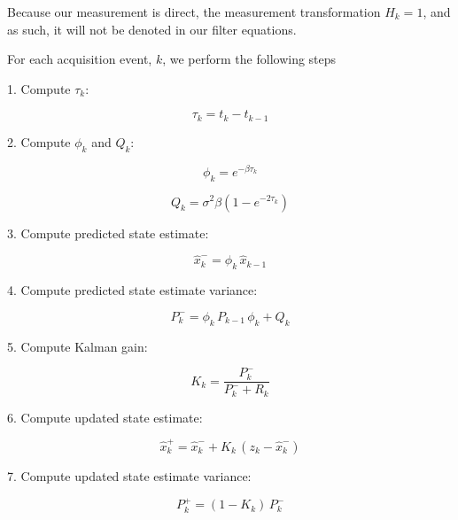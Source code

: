 \documentclass[12pt]{article}
\begin{document}
Because our measurement is direct, the measurement transformation $H_k = 1$, and as such,
it will not be denoted in our filter equations.

For each acquisition event, $k$, we perform the following steps

1. Compute $\tau_k$:

\begin{equation}
    \tau_k = t_k - t_{k-1}
    \label{eq:KF-tau}
\end{equation}

2. Compute $\phi_k$ and $Q_k$:

\begin{equation}
   \phi_k = e^{-\beta \tau_k}
   \label{eq:KF-phi}
\end{equation}

\begin{equation}
  Q_k = \sigma^2 \beta \left ( 1 - e^{-2 \tau_k} \right )
  \label{eq:KF-Q}
\end{equation}

3. Compute predicted state estimate:

\begin{equation}
    \hat{x}_k^- = \phi_k \, \hat{x}_{k-1}
    \label{eq:KF-x-prediction}
\end{equation}

4. Compute predicted state estimate variance:

\begin{equation}
    P_k^- = \phi_k \, P_{k-1} \, \phi_k + Q_k
    \label{eq:KF-P-prediction}
\end{equation}

5. Compute Kalman gain:

\begin{equation}
    K_k = \frac{P_k^-}{P_k^- + R_k}
    \label{eq:KF-gain}
\end{equation}

6. Compute updated state estimate:

\begin{equation}
    \hat{x}_k^+ = \hat{x}_k^- + K_k \,(z_k - \hat{x}_k^-)
    \label{eq:KF-x-update}
\end{equation}

7. Compute updated state estimate variance:

\begin{equation}
    P_k^+ = (1 - K_k) \, P_k^-
    \label{eq:KF-P-update}
\end{equation}
\end{document}
